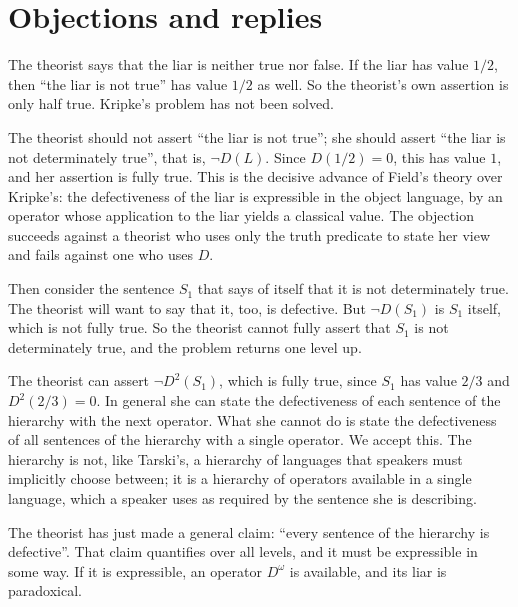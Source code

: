\documentclass{situationist-preprint}
\begin{document}
\section{Objections and replies}\label{s:obj}

\begin{objection}
The theorist says that the liar is neither true nor false. If the liar has value $1/2$, then \enquote{the liar is not true} has value $1/2$ as well. So the theorist's own assertion is only half true. Kripke's problem has not been solved.
\end{objection}

\begin{reply}
The theorist should not assert \enquote{the liar is not true}; she should assert \enquote{the liar is not determinately true}, that is, $\neg D(L)$. Since $D(1/2) = 0$, this has value $1$, and her assertion is fully true. This is the decisive advance of Field's theory over Kripke's: the defectiveness of the liar is expressible in the object language, by an operator whose application to the liar yields a classical value. The objection succeeds against a theorist who uses only the truth predicate to state her view and fails against one who uses $D$.
\end{reply}

\begin{objection}
Then consider the sentence $S_1$ that says of itself that it is not determinately true. The theorist will want to say that it, too, is defective. But $\neg D(S_1)$ is $S_1$ itself, which is not fully true. So the theorist cannot fully assert that $S_1$ is not determinately true, and the problem returns one level up.
\end{objection}

\begin{reply}
The theorist can assert $\neg D^2(S_1)$, which is fully true, since $S_1$ has value $2/3$ and $D^2(2/3) = 0$. In general she can state the defectiveness of each sentence of the hierarchy with the next operator. What she cannot do is state the defectiveness of all sentences of the hierarchy with a single operator. We accept this. The hierarchy is not, like Tarski's, a hierarchy of languages that speakers must implicitly choose between; it is a hierarchy of operators available in a single language, which a speaker uses as required by the sentence she is describing.
\end{reply}

\begin{objection}
The theorist has just made a general claim: \enquote{every sentence of the hierarchy is defective}. That claim quantifies over all levels, and it must be expressible in some way. If it is expressible, an operator $D^\omega$ is available, and its liar is paradoxical.
\end{objection}
\end{document}
